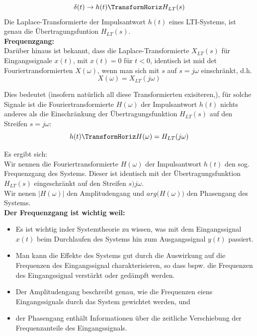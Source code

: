 \documentclass[12pt,a4paper]{scrartcl}
\begin{document}
  \begin{equation}
    \label{eq:36}
   \delta (t) \to h(t) \TransformHoriz H_{LT}(s)
  \end{equation}
  Die Laplace-Transformierte der Impulsantwort $h(t)$ eines LTI-Systems, ist genau die Übertragungsfuntion $H_{LT}(s)$. \\

  \noindent \textbf{Frequenzgang:} \\
  \noindent  Darüber hinaus ist bekannt, dass die Laplace-Transformierte $X_{LT}(s)$ für Eingangssignale $x(t)$, mit $x(t) = 0$ für $t <0$, identisch ist mid det Fouriertransformierten $X(\omega)$, wenn man sich mit $s$ auf $s=j\omega$ einschränkt, d.h.
  $$X(\omega) = X_{LT}(j\omega)$$

  \noindent Dies bedeutet (insofern natürlich all diese Transformierten exisiteren,), für solche Signale ist die Fouriertransformierte $H(\omega)$ der Impulsantwort $h(t)$ nichts anderes als die Einschränkung der Übertragungsfunktion $H_{LT}(s)$ auf den Streifen $s = j\omega$:
  \begin{equation}
    \label{eq:37}
    h(t) \TransformHoriz H(\omega) = H_{LT}(j\omega)
  \end{equation}

  \noindent Es ergibt sich: \\
  Wir nennen die Fouriertransformierte $H(\omega)$ der Impulsantwort $h(t)$ den sog. Frequenzgang des Systems. Dieser ist identisch mit der Übertragungsfunktion $H_{LT}(s)$ eingeschränkt auf den Streifen $s ) j\omega$. \\
  Wir nenen $|H(\omega)|$ den Amplitudengang und $arg\big(H(\omega)\big)$ den Phasengang des Systems. \\

  \noindent  \textbf{Der Frequenzgang ist wichtig weil:}
  \begin{itemize}
    \item Es ist wichtig inder Systemtheorie zu wissen, was mit dem Eingangssignal $x(t)$ beim Durchlaufen des Systems hin zum Ausgangssignal $y(t)$ passiert.
    \item Man kann die Effekte des Systems gut durch die Auswirkung auf die Frequenzen des Eingangssignal charakterisieren, so dass bspw. die Frequenzen des Eingangssignal verstärkt oder gedämpft werden.
    \item Der Amplitudengang beschreibt genau, wie die Frequenzen eiens Eingangssignals durch das System gewichtet werden, und 
    \item der Phasengang enthält Informationen über die zeitliche Verschiebung der Frequenzanteile des Eingangssignals.
  \end{itemize}
\end{document}
